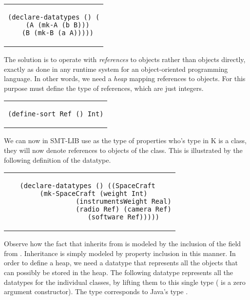 \begin{center}
\begin{tabular}{c}
\begin{lstlisting}
(declare-datatypes () (
  (A (mk-A (b B)))
  (B (mk-B (a A)))))
\end{lstlisting}
\end{tabular}
\end{center}

\noindent The solution is to operate with {\em references} to objects rather
than objects directly, exactly as done in any runtime system for an
object-oriented programming language. In other words, we need a {\em
  heap} mapping references to objects. For this purpose must define
the type of references, which are just integers.

\begin{center}
\begin{tabular}{c}
\begin{lstlisting}
(define-sort Ref () Int)
\end{lstlisting}
\end{tabular}
\end{center}

\noindent We can now in SMT-LIB use  as the type of properties who's 
type in K is a class, they will now denote references to objects of the class.
This is illustrated by the following definition of the  datatype.

\begin{center}
\begin{tabular}{c}
\begin{lstlisting}  
(declare-datatypes () ((SpaceCraft 
  (mk-SpaceCraft (weight Int)
                 (instrumentsWeight Real)
                 (radio Ref) (camera Ref)
                 (software Ref)))))
\end{lstlisting}
\end{tabular}
\end{center}

\noindent Observe how the fact that  inherits from
 is modeled by the inclusion of the  field
from . Inheritance is simply modeled by property
inclusion in this manner.  In order to define a heap, we need a
datatype that represents all the objects that can possibly be stored
in the heap. The following datatype  represents all the
datatypes for the individual classes, by lifting them to this single
type ( is a zero argument constructor). The type 
corresponds to Java's type .

